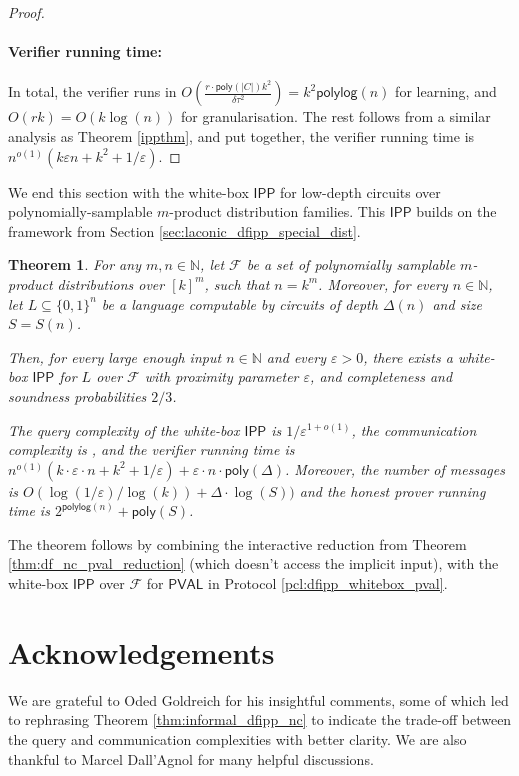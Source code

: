 \documentclass[10pt,a4paper]{article}
\newtheorem{theorem}{Theorem}[section]
\newcommand{\poly}{\mathsf{poly}}
\newcommand{\polylog}{\mathsf{polylog}}
\newcommand{\PVAL}{\mathsf{PVAL}}
\newcommand{\IPP}{\mathsf{IPP}}
\newcommand{\N}{\mathbb{N}}
\newcommand{\sF}{\mathcal{F}}
\begin{document}
\begin{proof}
\paragraph*{Verifier running time:} In total, the verifier runs in $O\left(\frac{r \cdot \poly(|C|)k^{2}}{\delta\tau^{2}}\right)= k^{2}\polylog (n)$ for learning, and $O(rk)=O(k\log (n))$ for granularisation. The rest follows from a similar analysis as Theorem \ref{ippthm}, and put together, the verifier running time is $n^{o(1)}(k\varepsilon n +k^{2}+ 1/\varepsilon)$.
\end{proof}

We end this section with the white-box $\IPP$ for low-depth circuits over polynomially-samplable $m$-product distribution families. This $\IPP$ builds on the framework from Section \ref{sec:laconic_dfipp_special_dist}.
\begin{theorem}
    \label{thm:dfipp_product_whitebox}
    For any $m,n \in \N$, let $\sF$ be a set of polynomially samplable $m$-product distributions over $[k]^m$, such that $n = k^m$. Moreover, for every $n \in \N$, let $L \subseteq \{0,1\}^{n}$ be a language computable by circuits of depth $\Delta(n)$ and size $S=S(n)$. 
    
    Then, for every large enough input $n \in \N$ and every $\varepsilon > 0$, there exists a white-box $\IPP$ for $L$ over $\sF$ with proximity parameter $\varepsilon$, and completeness and soundness probabilities $2/3$.
    
    The query complexity of the white-box $\IPP$ is $1/\varepsilon^{1+o(1)}$, the communication complexity is \sloppy{$\polylog(n) \cdot \left(k^{2}+k\cdot\varepsilon^{1-o(1)}\cdot n \right)+\varepsilon\cdot n\cdot \poly(\Delta)$}, and the verifier running time is $n^{o(1)}(k\cdot\varepsilon\cdot n +k^{2}+ 1/\varepsilon)+\varepsilon \cdot n\cdot\poly(\Delta)$. Moreover, the number of messages is $O(\log(1/\varepsilon)/\log(k))+\Delta \cdot \log(S))$ and the honest prover running time is $2^{\polylog(n)}+\poly(S)$.
\end{theorem}

The theorem follows by combining the interactive reduction from Theorem \ref{thm:df_nc_pval_reduction} (which doesn't access the implicit input), with the white-box $\IPP$ over $\sF$ for $\PVAL$ in Protocol \ref{pcl:dfipp_whitebox_pval}.


\section*{Acknowledgements}
We are grateful to Oded Goldreich for his insightful comments, some of which led to rephrasing Theorem \ref{thm:informal_dfipp_nc} to indicate the trade-off between the query and communication complexities with better clarity. We are also thankful to Marcel Dall'Agnol for many helpful discussions.
\end{document}
